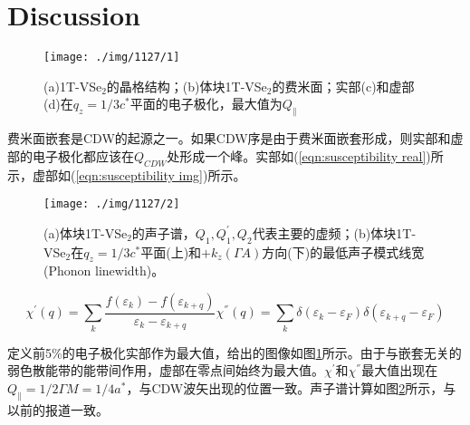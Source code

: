 \documentclass[reprint, aps, prb, showkeys]{revtex4-2}
\begin{document}
\section{Discussion}
\begin{figure}[t]
    \texttt{[image: ./img/1127/1]}
    \caption{\label{fig:1} 
    (a)1T-VSe$_2$的晶格结构；(b)体块1T-VSe$_2$的费米面；实部(c)和虚部(d)在$q_z = 1/3 c^*$平面的电子极化，最大值为$Q_{\parallel}$
    }
\end{figure}
费米面嵌套是CDW的起源之一。如果CDW序是由于费米面嵌套形成，则实部和虚部的电子极化都应该在$Q_{CDW}$处形成一个峰。实部如(\ref{eqn:susceptibility real})所示，虚部如(\ref{eqn:susceptibility img})所示。
\begin{figure}[b]
    \texttt{[image: ./img/1127/2]}
    \caption{\label{fig: phonon} 
    (a)体块1T-VSe$_2$的声子谱，$Q_1, Q_1^{'}, Q_2$代表主要的虚频；(b)体块1T-VSe$_2$在$q_z = 1/3 c^*$平面(上)和$+k_{z}({\Gamma}A)$方向(下)的最低声子模式线宽(Phonon linewidth)。    
    }
\end{figure}

\begin{subequations}
    \begin{equation}
        \chi^{'}(q) = \sum_k \frac{f(\varepsilon_k) - f(\varepsilon_{k + q})}{\varepsilon_k - \varepsilon_{k + q}}
        \label{eqn:susceptibility real}
    \end{equation}
    \begin{equation}
        \chi^{''}(q) = \sum_k \delta(\varepsilon_k - \varepsilon_F)\delta(\varepsilon_{k + q} - \varepsilon_F)
        \label{eqn:susceptibility img}
    \end{equation}
\end{subequations}

定义前5\%的电子极化实部作为最大值，给出的图像如图\ref{fig:1}所示。由于与嵌套无关的弱色散能带的能带间作用，虚部在零点间始终为最大值。$\chi^{'}$和$\chi^{''}$最大值出现在$Q_{\parallel} = 1/2 {\Gamma}M = 1/4 a^*$，与CDW波矢出现的位置一致。声子谱计算如图\ref{fig: phonon}所示，与以前的报道一致。
\end{document}
